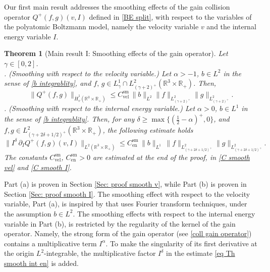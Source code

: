 \documentclass[11pt,a4paper]{amsart}
\newcommand{\bRp}{\mathbb{R}_+}
\newcommand{\bRfp}{\mathbb{R}^3 \times \bRp}
\newcommand{\g}{\gamma}
\newcommand{\Ls}{L^1}
\newcommand{\test}{I^\delta}
\newcommand{\Csvel}{C_{\text{vel}}^{\text{sm}}}
\newcommand{\Csen}{C_{\text{en}}^{\text{sm}}}
\newtheorem{theorem}{Theorem}
\begin{document}
 
Our first main result addresses the smoothing effects of the gain collision operator $Q^+(f,g)(v,I)$ defined in \eqref{BE split}, with respect to the variables of the polyatomic Boltzmann model, namely the velocity variable $v$ and the internal energy variable $I$.
 

 

\begin{theorem}[Main result I: Smoothing effects of the gain operator]\label{inc-reg}
	Let $\gamma\in[0,2]$. \\
	. (Smoothing with respect to the velocity variable.) Let $\alpha>-1$, $b\in L^{2}$ in the sense of \eqref{b integrablity}, and  $f,\,g \in L^{1}_{\gamma}\cap L^{2}_{(\gamma+2)^+}(\bRfp)$. Then,
	\begin{equation}\label{eq Th smooth vel}
		\| Q^+(f,g) \|_{\dot{H}^{1}_{v}(\bRfp)}\leq \Csvel \, \|b\|_{L^{2}}\| f \|_{L^{2}_{(\gamma+2)^+}}\| g \|_{L^{2}_{(\gamma+2)^+}}.
	\end{equation}
	. (Smoothing with respect to the internal energy variable.) 	
  Let  $\alpha>0$,  $b \in L^1$ in the sense of \eqref{b integrablity}. Then, for any  $\delta\geq\max\{ \left(\frac{1}{2} - \alpha\right)^+,0\}$, and $f, g \in L^2_{(\g+2\delta+1/2)^+}(\bRfp)$, the following estimate holds 
		\begin{equation}\label{eq Th smooth int en}
	\|  \test \, \partial_{I}		Q^+(f,g)(v,I)  \|_{L^2(\bRfp)}
			\leq \Csen \,  \| b \|_{\Ls} \,  \| f\|_{L^2_{(\g+2\delta+1/2)^+}}    \| g\|_{L^2_{(\g+2\delta+1/2)^+}}.
		\end{equation}
	The constants $\Csvel$, $\Csen>0$ are  estimated at the end of the proof, in \eqref{C smooth vel} and \eqref{C smooth I}.
\end{theorem}
Part (a) is proven in Section \ref{Sec: proof smooth v}, while Part (b) is proven in Section \ref{Sec: proof smooth I}.  The smoothing effect with respect to the velocity variable, Part (a),  is inspired by \cite{BD} that uses Fourier transform techniques, under the assumption $b\in L^2$. The smoothing effects with respect to the  internal energy variable in Part (b), is restricted by the regularity of the kernel of the gain operator. Namely, the strong form of the gain operator (see \eqref{coll gain operator}) contains a multiplicative term $I^\alpha$. To make the singularity of  its first derivative at the origin $L^2$-integrable, the multiplicative factor $I^\delta$ in the estimate \eqref{eq Th smooth int en} is added.  

 
 
\end{document}
